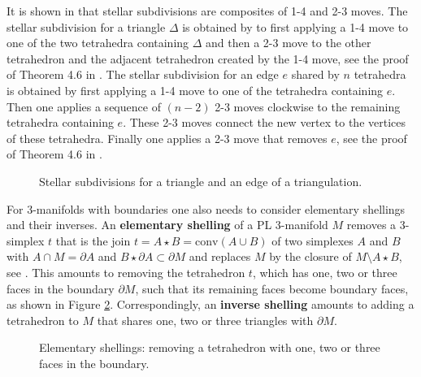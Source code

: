 \documentclass[1.5pt, a4paper]{article}
\begin{document}
It is shown in \cite{BW} that stellar subdivisions are composites of 1-4 and 2-3 moves. The stellar subdivision for a triangle $\Delta$ is obtained by to first applying a 1-4 move   to one of the two tetrahedra containing $\Delta$ and then a 2-3 move to the other tetrahedron and the adjacent tetrahedron created by the 1-4 move, see the proof of Theorem 4.6 in \cite{BW}. The stellar subdivision for an edge $e$ shared by $n$ tetrahedra  is obtained by first applying a 1-4  move  to one of the tetrahedra containing $e$.  Then one applies a sequence of $(n-2)$  2-3  moves  clockwise to the remaining tetrahedra containing  $e$. These 2-3 moves  connect the new vertex  to the vertices of these  tetrahedra.  Finally one applies a 2-3  move that removes $e$, see the proof of Theorem 4.6 in  \cite{BW}.  





\begin{figure}
\begin{center}
\def\svgwidth{.41\columnwidth}
 
\end{center}
\caption{Stellar subdivisions for a triangle and an edge of a triangulation.}
\label{fig:stellar}
\end{figure}




For 3-manifolds with boundaries one also needs to consider elementary shellings and their inverses. An {\bf elementary shelling} of a PL 3-manifold $M$ removes a 3-simplex $t$ that is the  join $t=A\star B=\mathrm{conv}(A\cup B)$ of two simplexes $A$ and $B$ with $A\cap M=\partial A$ and $B\star \partial A\subset \partial M$ and replaces $M$ by the closure of $M\setminus A\star B$, see \cite[Def.~5.2]{L}. This amounts to removing the tetrahedron $t$, which has  one, two or three faces in the boundary $\partial M$, such that its remaining faces become boundary faces, as shown in Figure \ref{fig:shellingdef}. Correspondingly, an {\bf inverse shelling} amounts to adding a tetrahedron to $M$ that shares  one, two  or three triangles with $\partial M$. 
 
 \begin{figure}
\begin{center}
\def\svgwidth{.37\columnwidth}
 
\end{center}
\caption{Elementary shellings: removing a tetrahedron with one, two or three faces in the boundary.}
\label{fig:shellingdef}
\end{figure}
 
\end{document}
